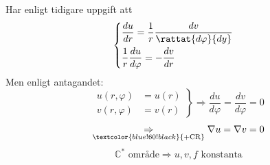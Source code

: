 Har enligt tidigare uppgift att
\[ \begin{cases} \dfrac{du}{dr} = \dfrac{1}{r} \dfrac{dv}{\rattat{d\varphi}{dy}} \\[2ex] \dfrac{1}{r} \dfrac{du}{d\varphi} = -\dfrac{dv}{dr} \end{cases} \]
Men enligt antagandet:
\[ \left.\begin{aligned} u(r, \varphi) &= u(r) \\ v(r, \varphi) &= v(r) \end{aligned}\right\} \Rightarrow \frac{du}{d\varphi} = \frac{dv}{d\varphi} = 0 \]
\[ \underset{\textcolor{blue!60!black}{+\text{CR}}}{\Rightarrow} \nabla u = \nabla v = 0 \]
\[ \mathbb{C}^* \text{ område} \Rightarrow u, v, f \text{ konstanta} \]
